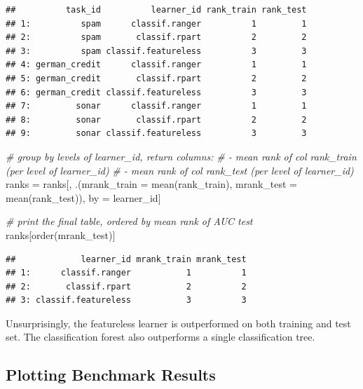 \documentclass[
]{scrbook}
\newenvironment{Shaded}{\begin{snugshade}}{\end{snugshade}}
\newcommand{\AttributeTok}[1]{\textcolor[rgb]{0.77,0.63,0.00}{#1}}
\newcommand{\CommentTok}[1]{\textcolor[rgb]{0.56,0.35,0.01}{\textit{#1}}}
\newcommand{\FunctionTok}[1]{\textcolor[rgb]{0.00,0.00,0.00}{#1}}
\newcommand{\NormalTok}[1]{#1}
\newcommand{\OtherTok}[1]{\textcolor[rgb]{0.56,0.35,0.01}{#1}}
\renewenvironment{Shaded} {\begin{snugshade}\small} {\end{snugshade}}
\begin{document}
\begin{verbatim}
##          task_id          learner_id rank_train rank_test
## 1:          spam      classif.ranger          1         1
## 2:          spam       classif.rpart          2         2
## 3:          spam classif.featureless          3         3
## 4: german_credit      classif.ranger          1         1
## 5: german_credit       classif.rpart          2         2
## 6: german_credit classif.featureless          3         3
## 7:         sonar      classif.ranger          1         1
## 8:         sonar       classif.rpart          2         2
## 9:         sonar classif.featureless          3         3
\end{verbatim}

\begin{Shaded}
\begin{Highlighting}[]
\CommentTok{\# group by levels of learner\_id, return columns:}
\CommentTok{\# {-} mean rank of col \textquotesingle{}rank\_train\textquotesingle{} (per level of learner\_id)}
\CommentTok{\# {-} mean rank of col \textquotesingle{}rank\_test\textquotesingle{} (per level of learner\_id)}
\NormalTok{ranks }\OtherTok{=}\NormalTok{ ranks[, .(}\AttributeTok{mrank\_train =} \FunctionTok{mean}\NormalTok{(rank\_train), }\AttributeTok{mrank\_test =} \FunctionTok{mean}\NormalTok{(rank\_test)), by }\OtherTok{=}\NormalTok{ learner\_id]}

\CommentTok{\# print the final table, ordered by mean rank of AUC test}
\NormalTok{ranks[}\FunctionTok{order}\NormalTok{(mrank\_test)]}
\end{Highlighting}
\end{Shaded}

\begin{verbatim}
##             learner_id mrank_train mrank_test
## 1:      classif.ranger           1          1
## 2:       classif.rpart           2          2
## 3: classif.featureless           3          3
\end{verbatim}

Unsurprisingly, the featureless learner is outperformed on both training and test set.
The classification forest also outperforms a single classification tree.

\hypertarget{autoplot-benchmarkresult}{%
\subsection{Plotting Benchmark Results}\label{autoplot-benchmarkresult}}
\end{document}
